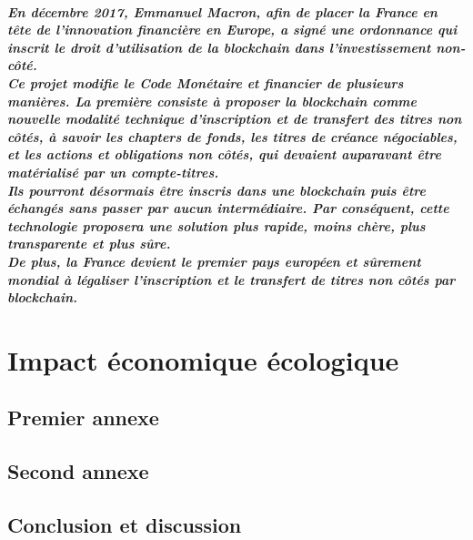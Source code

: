 \documentclass[12pt, a4paper, oneside]{book}
\begin{document}
    \paragraph{En décembre 2017, Emmanuel Macron, afin de placer la France en tête de l'innovation financière en Europe, 
    a signé une ordonnance qui inscrit le droit d'utilisation de la blockchain dans l'investissement non-côté.
    \\
    \newline
    Ce projet modifie le Code Monétaire et financier de plusieurs manières. La première consiste à proposer la blockchain comme nouvelle 
    modalité technique d'inscription et de transfert des titres non côtés, à savoir les chapters de fonds, les titres de créance négociables,
    et les actions et obligations non côtés, qui devaient auparavant être matérialisé par un compte-titres.
    \\
    \newline
    Ils pourront désormais être inscris dans une blockchain puis être échangés sans passer par aucun intermédiaire.
    Par conséquent, cette technologie proposera une solution plus rapide, moins chère, plus transparente et plus sûre.
    \\
    \newline
    De plus, la France devient le premier pays européen et sûrement mondial à légaliser l'inscription et le transfert de titres non côtés par blockchain. 
    \cite{CodeMonetaireFinancier}}

    \chapter{Impact économique écologique}
 
    \appendix
 
    \section{Premier annexe}
    \section{Second annexe}
 
    
    \backmatter
 
    \section{Conclusion et discussion}
 
    
    \tableofcontents

    
    
 
\end{document}
